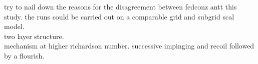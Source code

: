 try to nail down the reasons for the disagreement between fedconz antt this study.  the runs could be carried out on a comparable grid and subgrid scal model.\\

two layer structure. \\

mechanism at higher richardson number. successive impinging and recoil followed by a flourish.\\

\FloatBarrier


\endinput

Any text after an \endinput is ignored.
You could put scraps here or things in progress.
